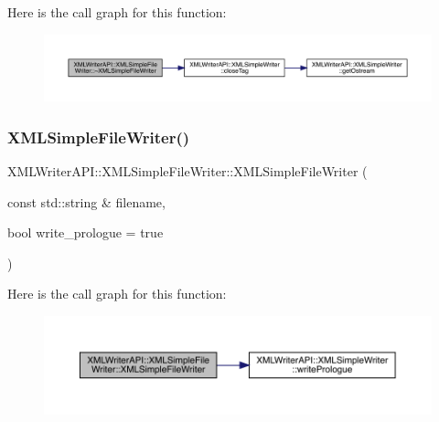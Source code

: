 Here is the call graph for this function\+:
\nopagebreak
\begin{figure}[H]
\begin{center}
\leavevmode
\includegraphics[width=350pt]{d2/de2/classXMLWriterAPI_1_1XMLSimpleFileWriter_a8a18cf3ea74f63a4f84a434237109e68_cgraph}
\end{center}
\end{figure}
\mbox{\label{classXMLWriterAPI_1_1XMLSimpleFileWriter_a8ce4f6691f7e2e803a14e0cba906a4b7}} 
\subsubsection{\texorpdfstring{XMLSimpleFileWriter()}{XMLSimpleFileWriter()}\hspace{0.1cm}{\footnotesize\ttfamily [2/3]}}
{\footnotesize\ttfamily X\+M\+L\+Writer\+A\+P\+I\+::\+X\+M\+L\+Simple\+File\+Writer\+::\+X\+M\+L\+Simple\+File\+Writer (\begin{DoxyParamCaption}\item[{const std\+::string \&}]{filename,  }\item[{bool}]{write\+\_\+prologue = {\ttfamily true} }\end{DoxyParamCaption})\hspace{0.3cm}{\ttfamily [inline]}}

Here is the call graph for this function\+:
\nopagebreak
\begin{figure}[H]
\begin{center}
\leavevmode
\includegraphics[width=350pt]{d2/de2/classXMLWriterAPI_1_1XMLSimpleFileWriter_a8ce4f6691f7e2e803a14e0cba906a4b7_cgraph}
\end{center}
\end{figure}
\mbox{\label{classXMLWriterAPI_1_1XMLSimpleFileWriter_a8a18cf3ea74f63a4f84a434237109e68}} 
